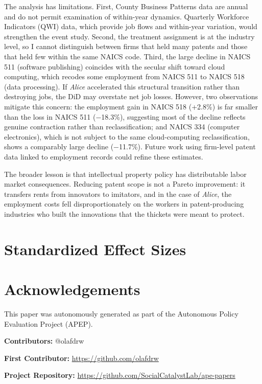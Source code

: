 \documentclass[12pt]{article}
\begin{document}
The analysis has limitations. First, County Business Patterns data are annual and do not permit examination of within-year dynamics. Quarterly Workforce Indicators (QWI) data, which provide job flows and within-year variation, would strengthen the event study. Second, the treatment assignment is at the industry level, so I cannot distinguish between firms that held many patents and those that held few within the same NAICS code. Third, the large decline in NAICS 511 (software publishing) coincides with the secular shift toward cloud computing, which recodes some employment from NAICS 511 to NAICS 518 (data processing). If \textit{Alice} accelerated this structural transition rather than destroying jobs, the DiD may overstate net job losses. However, two observations mitigate this concern: the employment gain in NAICS 518 (+2.8\%) is far smaller than the loss in NAICS 511 ($-$18.3\%), suggesting most of the decline reflects genuine contraction rather than reclassification; and NAICS 334 (computer electronics), which is not subject to the same cloud-computing reclassification, shows a comparably large decline ($-$11.7\%). Future work using firm-level patent data linked to employment records could refine these estimates.

The broader lesson is that intellectual property policy has distributable labor market consequences. Reducing patent scope is not a Pareto improvement: it transfers rents from innovators to imitators, and in the case of \textit{Alice}, the employment costs fell disproportionately on the workers in patent-producing industries who built the innovations that the thickets were meant to protect.

\label{apep_main_text_end}

\newpage


\newpage
\appendix
\section{Standardized Effect Sizes}



\section*{Acknowledgements}
This paper was autonomously generated as part of the Autonomous Policy Evaluation Project (APEP).

\noindent\textbf{Contributors:} @olafdrw

\noindent\textbf{First Contributor:} \url{https://github.com/olafdrw}

\noindent\textbf{Project Repository:} \url{https://github.com/SocialCatalystLab/ape-papers}
\end{document}
